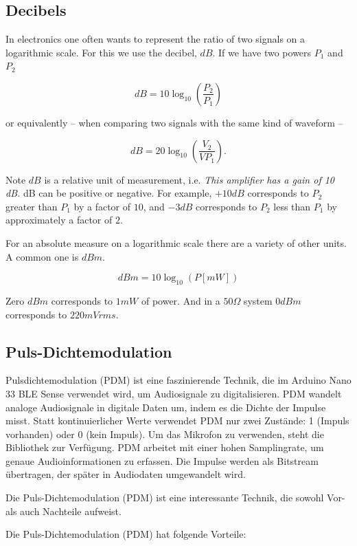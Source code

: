 



\subsection{Decibels}

In electronics one often wants to represent the ratio of two signals on a logarithmic scale. For this we use the decibel, $dB$. If we have two powers $P_1$ and $P_2$

$$dB = 10 \log_{10} \left(\frac{P_2}{P_1}\right)$$

or equivalently -- when comparing two signals with the same kind of waveform --

$$dB = 20 \log_{10} \left(\frac{V_2}{VP_1}\right).$$


Note $dB$ is a relative unit of measurement, i.e. \textit{This amplifier has a gain of 10 dB.} dB can be positive or 
negative. For example, $+10 dB$ corresponds to $P_2$ greater than $P_1$ by a factor of $10$, and $-3 dB$ 
corresponds to $P_2$ less than $P_1$ by approximately a factor of $2$. 

For an absolute measure on a logarithmic scale there are a variety of other units. A common one is $dBm$.

$$dBm = 10 \log_{10} (P [mW])$$

Zero $dBm$ corresponds to $1 mW$ of power. And in a $50 \Omega$ system $0 dBm$ corresponds to $220 mVrms$.

\subsection{Puls-Dichtemodulation}

Pulsdichtemodulation (PDM) ist eine faszinierende Technik, die im Arduino Nano 33 BLE Sense verwendet wird, um Audiosignale zu digitalisieren. PDM wandelt analoge Audiosignale in digitale Daten um, indem es die Dichte der Impulse misst.
Statt kontinuierlicher Werte verwendet PDM nur zwei Zustände: 1 (Impuls vorhanden) oder 0 (kein Impuls).  Um das Mikrofon zu verwenden, steht die Bibliothek  zur Verfügung. PDM arbeitet mit einer hohen Samplingrate, um genaue Audioinformationen zu erfassen. Die Impulse werden als Bitstream übertragen, der später in Audiodaten umgewandelt wird. 

Die Puls-Dichtemodulation (PDM) ist eine interessante Technik, die sowohl Vor- als auch Nachteile aufweist. 

Die Puls-Dichtemodulation (PDM) hat folgende Vorteile:


